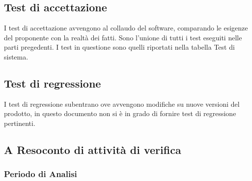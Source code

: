 \subsection{Test di accettazione}
I test di accettazione avvengono al collaudo del software, comparando le esigenze del
proponente con la realtà dei fatti. Sono l'unione di tutti i test eseguiti nelle
parti pregedenti. \newline
I test in questione sono quelli riportati nella tabella Test di sistema.

\subsection{Test di regressione}
I test di regressione subentrano ove avvengono modifiche su nuove versioni del prodotto,
in questo documento non si è in grado di fornire test di regressione pertinenti.

\newpage

\subsection{A   Resoconto di attività di verifica}
\subsubsection{Periodo di Analisi}
